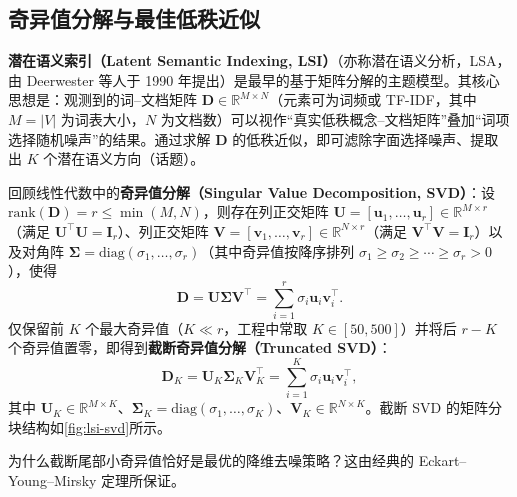\subsection{奇异值分解与最佳低秩近似}

\textbf{潜在语义索引（Latent Semantic Indexing, LSI）}（亦称潜在语义分析，LSA，由 Deerwester 等人于 1990 年提出）是最早的基于矩阵分解的主题模型。其核心思想是：观测到的词--文档矩阵 $\mathbf{D}\in\mathbb{R}^{M\times N}$（元素可为词频或 TF-IDF，其中 $M=|V|$ 为词表大小，$N$ 为文档数）可以视作“真实低秩概念--文档矩阵”叠加“词项选择随机噪声”的结果。通过求解 $\mathbf{D}$ 的低秩近似，即可滤除字面选择噪声、提取出 $K$ 个潜在语义方向（话题）。

回顾线性代数中的\textbf{奇异值分解（Singular Value Decomposition, SVD）}：设 $\mathrm{rank}(\mathbf{D})=r \le \min(M,N)$，则存在列正交矩阵 $\mathbf{U}=[\mathbf{u}_1,\dots,\mathbf{u}_r]\in\mathbb{R}^{M\times r}$（满足 $\mathbf{U}^\top\mathbf{U}=\mathbf{I}_r$）、列正交矩阵 $\mathbf{V}=[\mathbf{v}_1,\dots,\mathbf{v}_r]\in\mathbb{R}^{N\times r}$（满足 $\mathbf{V}^\top\mathbf{V}=\mathbf{I}_r$）以及对角阵 $\boldsymbol{\Sigma}=\mathrm{diag}(\sigma_1,\dots,\sigma_r)$（其中奇异值按降序排列 $\sigma_1\ge\sigma_2\ge\cdots\ge\sigma_r>0$），使得
\begin{equation}\label{eq:svd}
\mathbf{D} = \mathbf{U}\boldsymbol{\Sigma}\mathbf{V}^\top = \sum_{i=1}^{r} \sigma_i \mathbf{u}_i \mathbf{v}_i^\top.
\end{equation}
仅保留前 $K$ 个最大奇异值（$K \ll r$，工程中常取 $K\in[50,500]$）并将后 $r-K$ 个奇异值置零，即得到\textbf{截断奇异值分解（Truncated SVD）}：
\begin{equation}\label{eq:truncated-svd}
\mathbf{D}_K = \mathbf{U}_K \boldsymbol{\Sigma}_K \mathbf{V}_K^\top = \sum_{i=1}^{K} \sigma_i \mathbf{u}_i \mathbf{v}_i^\top,
\end{equation}
其中 $\mathbf{U}_K\in\mathbb{R}^{M\times K}$、$\boldsymbol{\Sigma}_K=\mathrm{diag}(\sigma_1,\dots,\sigma_K)$、$\mathbf{V}_K\in\mathbb{R}^{N\times K}$。截断 SVD 的矩阵分块结构如\cref{fig:lsi-svd}所示。


为什么截断尾部小奇异值恰好是最优的降维去噪策略？这由经典的 Eckart--Young--Mirsky 定理所保证。

